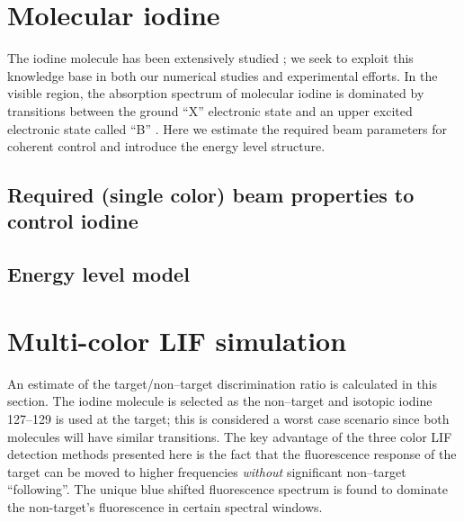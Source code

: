 
\section{Molecular iodine}
The iodine molecule has been extensively studied \cite{Martin:1986a,Wei:1974a,Tellinghuisen:1978a,Gerstenkorn:1981a,Gerstenkorn:1991a,Lamrini:1993a,Lewis:1994a}; we seek to exploit this knowledge base in both our numerical studies and experimental efforts. In the visible region, the absorption spectrum of molecular iodine is dominated by transitions between the ground ``X'' electronic state and an upper excited electronic state called ``B'' \cite{Lewis:1993a}. Here we estimate the required beam parameters for coherent control and introduce the energy level structure.
\subsection{Required (single color) beam properties to control iodine}

\subsection{Energy level model}

\section{Multi-color LIF simulation}
An estimate of the target/non--target discrimination ratio is calculated in this section. The iodine molecule is selected as the non--target and isotopic iodine 127--129 is used at the target; this is considered a worst case scenario since both molecules will have similar transitions. The key advantage of the three color LIF detection methods presented here is the fact that the fluorescence response of the target can be moved to higher frequencies \emph{without} significant non--target ``following''. The unique blue shifted fluorescence spectrum is found to dominate the non-target's fluorescence in certain spectral windows.
